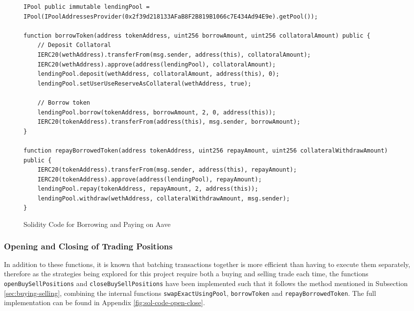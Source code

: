 \begin{figure}[htb!]
\begin{adjustwidth}{-0.5in}{-0.5in}
\begin{minipage}{\linewidth}
\centering
\begin{lstlisting}[language=Solidity]
IPool public immutable lendingPool = IPool(IPoolAddressesProvider(0x2f39d218133AFaB8F2B819B1066c7E434Ad94E9e).getPool());

function borrowToken(address tokenAddress, uint256 borrowAmount, uint256 collatoralAmount) public {
    // Deposit Collatoral
    IERC20(wethAddress).transferFrom(msg.sender, address(this), collatoralAmount);
    IERC20(wethAddress).approve(address(lendingPool), collatoralAmount);
    lendingPool.deposit(wethAddress, collatoralAmount, address(this), 0);
    lendingPool.setUserUseReserveAsCollateral(wethAddress, true);

    // Borrow token
    lendingPool.borrow(tokenAddress, borrowAmount, 2, 0, address(this));
    IERC20(tokenAddress).transferFrom(address(this), msg.sender, borrowAmount);
}

function repayBorrowedToken(address tokenAddress, uint256 repayAmount, uint256 collateralWithdrawAmount) public {
    IERC20(tokenAddress).transferFrom(msg.sender, address(this), repayAmount);
    IERC20(tokenAddress).approve(address(lendingPool), repayAmount);
    lendingPool.repay(tokenAddress, repayAmount, 2, address(this));
    lendingPool.withdraw(wethAddress, collateralWithdrawAmount, msg.sender);
}
\end{lstlisting}
\end{minipage}
\end{adjustwidth}
\caption{Solidity Code for Borrowing and Paying on Aave \label{fig:sol-code-aave}}
\end{figure}
\subsubsection{Opening and Closing of Trading Positions}
In addition to these functions, it is known that batching transactions together is more efficient than having to execute them separately, therefore as the strategies being explored for this project require both a buying and selling trade each time, the functions \texttt{openBuySellPositions} and \texttt{closeBuySellPositions} have been implemented such that it follows the method mentioned in Subsection \ref{sec:buying-selling}, combining the internal functions \texttt{swapExactUsingPool}, \texttt{borrowToken} and \texttt{repayBorrowedToken}. The full implementation can be found in Appendix \ref{fig:sol-code-open-close}.

